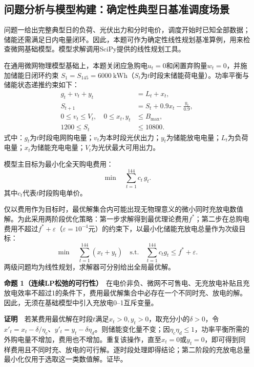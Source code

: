 
\subsection{问题分析与模型构建：确定性典型日基准调度场景}
问题一给出完整典型日的负荷、光伏出力和分时电价，调度开始时已知全部数据；储能还需满足日内电量闭环。因此，本题可作为确定性线性规划基准算例，用来检查微网基础模型。模型求解调用SciPy提供的线性规划工具\cite{virtanen2020scipy}。

在通用微网物理模型基础上，本题关闭应急购电$u_t=0$和闲置弃购量$w_t=0$，并施加储能日闭环约束 $S_1=S_{145}=6000\ \mathrm{kWh}$（$S_t$为$t$时段末储能荷电量）。功率平衡与储能状态递推约束如下：
\begin{align}
g_t + v_t + y_t &= L_t + x_t, \label{eq:q1balance}\\
S_{t+1} &= S_t + 0.9x_t - \frac{y_t}{0.9}, \label{eq:q1soc}\\
0 \le v_t \le V_t,\quad 0 \le x_t,y_t &\le B_{\max}, \label{eq:q1bound1}\\
1200 \le S_t &\le 10800. \label{eq:q1bound2}
\end{align}
式中：$g_t$为$t$时段电网购电量；$v_t$为本时段光伏出力；$y_t$为储能放电电量；$L_t$为负荷电量；$x_t$为储能充电电量；$V_t$为光伏最大可用出力。

模型主目标为最小化全天购电费用：
\begin{equation}
\min \quad \sum_{t=1}^{144} c_t\, g_t.
\label{eq:q1main}
\end{equation}
其中$c_t$代表$t$时段购电单价。

仅以费用作为目标时，最优解集合内可能出现无物理意义的微小同时充放电数值解。为此采用两阶段优化策略：第一步求解得到最优理论费用$f^*$；第二步在总购电费用不超过$f^*+\varepsilon$（$\varepsilon=10^{-4}$元）的约束下，以最小化储能充放电总量作为次级目标：
\begin{equation}
\min \quad \sum_{t=1}^{144}(x_t+y_t) \quad \text{s.t.}\quad \sum_{t=1}^{144} c_t g_t \le f^*+\varepsilon.
\label{eq:q1sub}
\end{equation}
两级问题均为线性规划，求解器可分别给出全局最优解。

\noindent\textbf{命题 1（连续LP松弛的可行性）}　在电价非负、微网不可售电、无充放电补贴且充放电效率不超过1的条件下，费用最优解集合中必存在一个不同时充、放电的解。因此，无须在基础模型中引入充放电0--1互斥变量。

\noindent\textbf{证明}　若某费用最优解在时段$t$满足$x_t>0,y_t>0$，取充分小的$\delta>0$，令$x'_t=x_t-\delta/\eta_c$、$y'_t=y_t-\delta\eta_d$。则储能变化量不变；因$\eta_c\eta_d\le1$，功率平衡所需的外购电量不增加，费用也不增加。重复该操作，直至$x_t=0$或$y_t=0$，即可得到同样费用且不同时充、放电的可行解。逐时段处理即得结论；第二阶段的充放电总量最小化仅用于选取这一类数值解。证毕。

